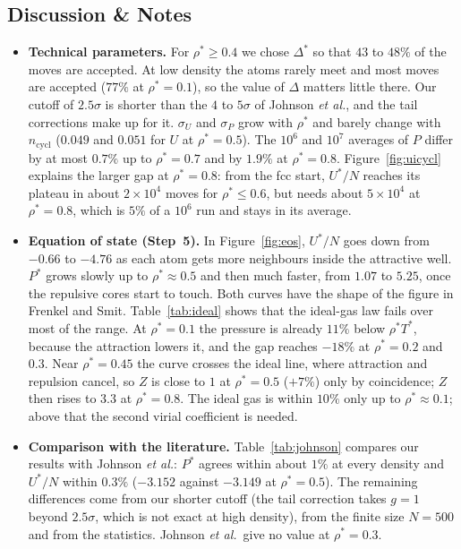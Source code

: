 \subsection{Discussion \& Notes}
\begin{itemize}
  \item \textbf{Technical parameters.} For $\rho^*\ge0.4$ we chose $\Delta^*$ so that $43$ to $48\%$ of the moves are accepted. At low density the atoms rarely meet and most moves are accepted ($77\%$ at $\rho^*=0.1$), so the value of $\Delta$ matters little there. Our cutoff of $2.5\sigma$ is shorter than the $4$ to $5\sigma$ of Johnson \emph{et al.}, and the tail corrections make up for it. $\sigma_U$ and $\sigma_P$ grow with $\rho^*$ and barely change with $n_{\mathrm{cycl}}$ ($0.049$ and $0.051$ for $U$ at $\rho^*=0.5$). The $10^6$ and $10^7$ averages of $P$ differ by at most $0.7\%$ up to $\rho^*=0.7$ and by $1.9\%$ at $\rho^*=0.8$. Figure~\ref{fig:uicycl} explains the larger gap at $\rho^*=0.8$: from the fcc start, $U^*/N$ reaches its plateau in about $2\times10^4$ moves for $\rho^*\le0.6$, but needs about $5\times10^4$ at $\rho^*=0.8$, which is $5\%$ of a $10^6$ run and stays in its average.

  \item \textbf{Equation of state (Step~5).} In Figure~\ref{fig:eos}, $U^*/N$ goes down from $-0.66$ to $-4.76$ as each atom gets more neighbours inside the attractive well. $P^*$ grows slowly up to $\rho^*\approx0.5$ and then much faster, from $1.07$ to $5.25$, once the repulsive cores start to touch. Both curves have the shape of the figure in Frenkel and Smit. Table~\ref{tab:ideal} shows that the ideal-gas law fails over most of the range. At $\rho^*=0.1$ the pressure is already $11\%$ below $\rho^*T^*$, because the attraction lowers it, and the gap reaches $-18\%$ at $\rho^*=0.2$ and $0.3$. Near $\rho^*=0.45$ the curve crosses the ideal line, where attraction and repulsion cancel, so $Z$ is close to $1$ at $\rho^*=0.5$ ($+7\%$) only by coincidence; $Z$ then rises to $3.3$ at $\rho^*=0.8$. The ideal gas is within $10\%$ only up to $\rho^*\approx0.1$; above that the second virial coefficient is needed.

  \item \textbf{Comparison with the literature.} Table~\ref{tab:johnson} compares our results with Johnson \emph{et al.}: $P^*$ agrees within about $1\%$ at every density and $U^*/N$ within $0.3\%$ ($-3.152$ against $-3.149$ at $\rho^*=0.5$). The remaining differences come from our shorter cutoff (the tail correction takes $g=1$ beyond $2.5\sigma$, which is not exact at high density), from the finite size $N=500$ and from the statistics. Johnson \emph{et al.}\ give no value at $\rho^*=0.3$.


\end{itemize}
